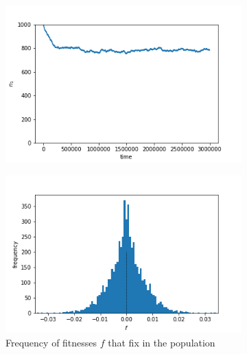 \documentclass{article}
\begin{document}
\begin{figure}[h]
	\centering
	\begin{subfigure}[t]{0.305\linewidth}
		\centering
		\includegraphics[width = 1.0\linewidth, trim={5 5 40 30}, clip=true]{figures/constant_selection_trajec.png}
		\label{fig:constant_trajec}	
	\end{subfigure}
	\hspace{0.03\linewidth}
	\begin{subfigure}[t]{0.305\linewidth}
		\centering
		\includegraphics[width = 1.0\linewidth, trim={5 5 40 30}, clip=true]{figures/constant_selection_hist2.png}
		\caption{Frequency of fitnesses $f$ that fix in the population}
		\label{fig:constant_hist}
	\end{subfigure}
	\hspace{0.03\linewidth}
	\begin{subfigure}[t]{0.305\linewidth}

\end{subfigure}
\end{figure}
\end{document}
